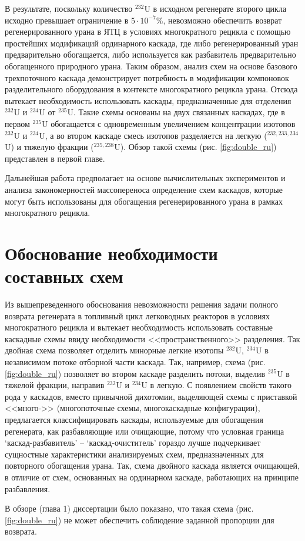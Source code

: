 В результате, поскольку количество $^{232}$U в исходном регенерате второго цикла исходно превышает ограничение в $5\cdot10^{-7}$\%, невозможно обеспечить возврат регенерированного урана в ЯТЦ в условиях многократного рецикла с помощью простейших модификаций ординарного каскада, где либо регенерированный уран предварительно обогащается, либо используется как разбавитель предварительно обогащенного природного урана.
Таким образом, анализ схем на основе базового трехпоточного каскада демонстрирует потребность в модификации компоновок разделительного оборудования в контексте многократного рецикла урана.
Отсюда вытекает необходимость использовать каскады, предназначенные для отделения $^{232}$U и $^{234}$U от $^{235}$U. Такие схемы основаны на двух связанных каскадах, где в первом $^{235}$U обогащается с одновременным увеличением концентрации изотопов $^{232}$U и $^{234}$U, а во втором каскаде смесь изотопов разделяется на легкую ($^{232,233,234}$U) и тяжелую фракции ($^{235,238}$U).
Обзор такой схемы (рис. \ref{fig:double_ru}) представлен в первой главе.

Дальнейшая работа предполагает на основе вычислительных экспериментов и анализа закономерностей массопереноса определение схем каскадов, которые могут быть использованы для обогащения регенерированного урана в рамках многократного рецикла.

\section{Обоснование необходимости составных схем}\label{sec:ch2/sec2}
Из вышепреведенного обоснования невозможности решения задачи полного возврата регенерата в топливный цикл легководных реакторов в условиях многократного рецикла и вытекает необходимость использовать составные каскадные схемы ввиду необходимости  <<пространственного>> разделения. Так двойная схема позволяет отделить минорные легкие изотопы $^{232}$U, $^{234}$U в независимом потоке отборной части каскада.
Так, например, схема (рис. \ref{fig:double_ru}) позволяет во втором каскаде разделить потоки, выделив $^{235}$U в тяжелой фракции, направив $^{232}$U и $^{234}$U в легкую.
С появлением свойств такого рода у каскадов, вместо привычной дихотомии, выделяющей схемы с приставкой <<много->> (многопоточные схемы, многокаскадные конфигурации), предлагается классифицировать каскады, используемые для обогащения регенерата, как разбавляющие или очищающие, потому что условная граница `каскад-разбавитель' -- `каскад-очиститель' гораздо лучше подчеркивает сущностные характеристики анализируемых схем, предназначенных для повторного обогащения урана. Так, схема двойного каскада является очищающей, в отличие от схем, основанных на ординарном каскаде, работающих на принципе разбавления.  

В обзоре (глава 1) диссертации было показано, что такая схема (рис. \ref{fig:double_ru}) не может обеспечить соблюдение заданной пропорции для возврата.
